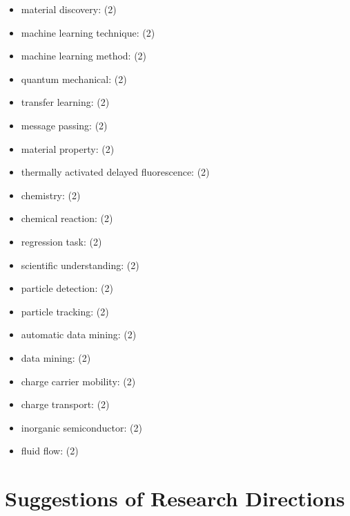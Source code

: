 \documentclass{article}%
\begin{document}
\begin{itemize}
\item%
material discovery: (2)%
\item%
machine learning technique: (2)%
\item%
machine learning method: (2)%
\item%
quantum mechanical: (2)%
\item%
transfer learning: (2)%
\item%
message passing: (2)%
\item%
material property: (2)%
\item%
thermally activated delayed fluorescence: (2)%
\item%
chemistry: (2)%
\item%
chemical reaction: (2)%
\item%
regression task: (2)%
\item%
scientific understanding: (2)%
\item%
particle detection: (2)%
\item%
particle tracking: (2)%
\item%
automatic data mining: (2)%
\item%
data mining: (2)%
\item%
charge carrier mobility: (2)%
\item%
charge transport: (2)%
\item%
inorganic semiconductor: (2)%
\item%
fluid flow: (2)%
\end{itemize}

%
\section{Suggestions of Research Directions}%
\label{sec:SuggestionsofResearchDirections}%
\end{document}
